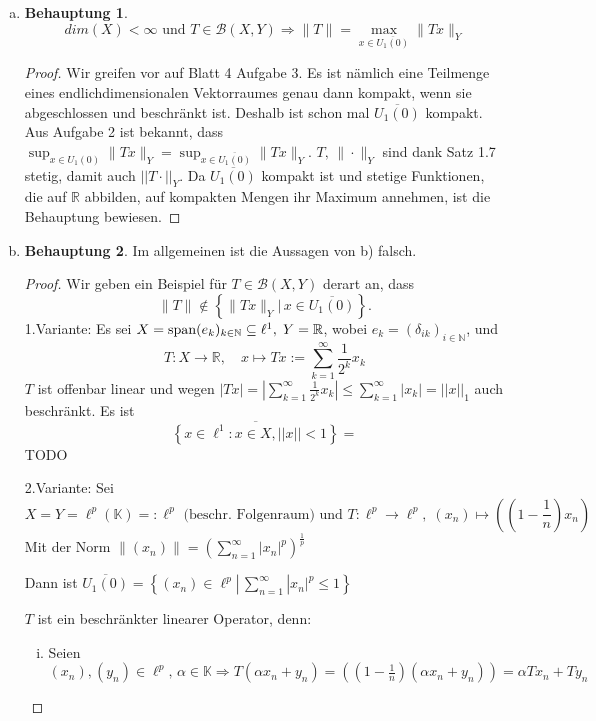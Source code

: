 \documentclass[ngerman]{article}
\theoremstyle{definition}%
\newtheorem*{beh}{Behauptung}
\newcommand{\R}{\mathbb{R}}
\newcommand{\N}{\mathbb{N}}
\newcommand{\K}{\mathbb{K}}
\newcommand{\B}{\mathcal{B}} %
\newcommand{\abs}[1]{\left\lvert #1 \right\rvert }
\newcommand{\norm}[1]{\left\lvert \left\lvert #1 \right\rvert \right\rvert}
\newcommand{\df}{\Rightarrow} %
\newcommand{\aufspan}{\textnormal{span}}
\renewcommand{\{ }{\left\lbrace}
\renewcommand{\}}{\right\rbrace}
\begin{document}
\begin{enumerate}[(a)]
\item

\begin{beh}
$$dim(X)<\infty \text{ und } T\in\B(X,Y) \df \|T\|= \max_{x\in\overline{U_1(0)}}\|Tx\|_Y$$
\end{beh}
\begin{proof}
Wir greifen vor auf Blatt 4 Aufgabe 3. Es ist nämlich eine Teilmenge eines endlichdimensionalen Vektorraumes genau dann kompakt, wenn sie abgeschlossen und beschränkt ist. Deshalb ist schon mal $\overline{U_1(0)}$ kompakt. Aus Aufgabe 2 ist bekannt, dass $\displaystyle\sup_{x\in U_1(0)} \|Tx\|_Y = \sup_{x\in\overline{U_1(0)}}\|Tx\|_Y$. $T,\,\|\cdot\|_Y$ sind dank Satz 1.7 stetig, damit auch $\norm{T \cdot}_Y$. Da $\overline{U_1(0)}$ kompakt ist und stetige Funktionen, die auf $\R$ abbilden, auf kompakten Mengen ihr Maximum annehmen, ist die Behauptung bewiesen.
\end{proof}

\item

\begin{beh}
Im allgemeinen ist die Aussagen von b) falsch.
\end{beh}
\begin{proof}
Wir geben ein Beispiel für $T\in\B(X,Y)$ derart an, dass 
$$\|T\| \not\in\left\lbrace\|Tx\|_Y|\,x\in\overline{U_1(0)}\right\rbrace.$$
1.Variante: Es sei $X = \aufspan (e_k)_{k\in\N} \subseteq \ell^1,\; Y = \R$, wobei $e_k = (\delta_{ik})_{i\in\N}$, und 
	$$T:X\to \R,\quad x \mapsto Tx := \sum^\infty_{k=1} \frac{1}{2^k}x_k$$
	$T$ ist offenbar linear und wegen $\abs{Tx} = \abs{ \sum^\infty_{k=1} \frac{1}{2^k}x_k } \leq \sum^\infty_{k=1} \abs{x_k} = \norm{x}_1$ auch beschränkt. Es ist 
	$$\overline{\left\lbrace x \in \ell^1 : x \in X, \norm{x} < 1 \right\rbrace }  = $$ TODO


2.Variante:
Sei  $$X=Y=\ell^p(\K)=:\ell^p \text{ (beschr. Folgenraum) und } T:\ell^p\to \ell^p,\;(x_n)\mapsto \left(\left(1-\frac{1}{n}\right)x_n\right)$$
Mit der Norm $\displaystyle \|(x_n)\|=\left(\sum^\infty_{n=1} |x_n|^p\right)^{\frac{1}{p}}$\par
Dann ist $\overline{U_1(0)} = \left\lbrace (x_n) \in \ell^p |\,\sum^\infty_{n=1} |x_n|^p \leq 1 \right\rbrace$\par
$T$ ist ein beschränkter linearer Operator, denn:
\begin{enumerate}[(i)]
\item Seien $(x_n),(y_n)\in \ell^p,\,\alpha \in \K\df T(\alpha x_n + y_n) = \left(\left(1-\frac{1}{n}\right)(\alpha x_n + y_n) \right) = \alpha Tx_n + Ty_n$


\end{enumerate}
\end{proof}
\end{enumerate}
\end{document}
